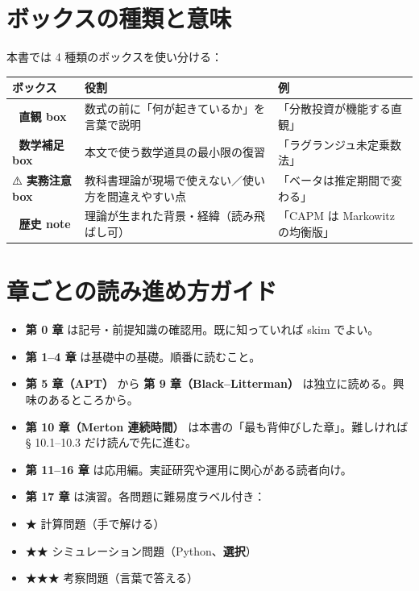 \documentclass[11pt,a4paper]{report}
\begin{document}
\section{ボックスの種類と意味}

本書では 4 種類のボックスを使い分ける：

\begin{center}
\begin{tabular}{|l|l|l|}
\hline
ボックス & 役割 & 例 \\ \hline
🎯 \textbf{直観 box} & 数式の前に「何が起きているか」を言葉で説明 & 「分散投資が機能する直観」 \\ \hline
📐 \textbf{数学補足 box} & 本文で使う数学道具の最小限の復習 & 「ラグランジュ未定乗数法」 \\ \hline
⚠️ \textbf{実務注意 box} & 教科書理論が現場で使えない／使い方を間違えやすい点 & 「ベータは推定期間で変わる」 \\ \hline
📜 \textbf{歴史 note} & 理論が生まれた背景・経緯（読み飛ばし可） & 「CAPM は Markowitz の均衡版」 \\ \hline
\end{tabular}
\end{center}

\section{章ごとの読み進め方ガイド}

\begin{itemize}
\item \textbf{第 0 章} は記号・前提知識の確認用。既に知っていれば skim でよい。
\item \textbf{第 1–4 章} は基礎中の基礎。順番に読むこと。
\item \textbf{第 5 章（APT）} から \textbf{第 9 章（Black–Litterman）} は独立に読める。興味のあるところから。
\item \textbf{第 10 章（Merton 連続時間）} は本書の「最も背伸びした章」。難しければ § 10.1–10.3 だけ読んで先に進む。
\item \textbf{第 11–16 章} は応用編。実証研究や運用に関心がある読者向け。
\item \textbf{第 17 章} は演習。各問題に難易度ラベル付き：
\item ★ 計算問題（手で解ける）
\item ★★ シミュレーション問題（Python、\textbf{選択}）
\item ★★★ 考察問題（言葉で答える）
\end{itemize}
\end{document}
